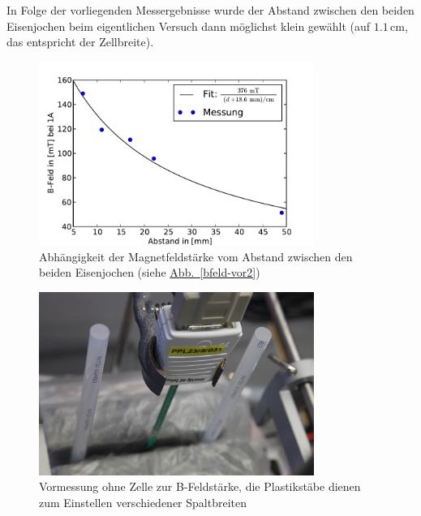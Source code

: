 \documentclass[11pt]{scrartcl}
\newcommand{\unit}[1]{\ensuremath{\,\mathrm{#1}}} %
\newcommand{\abb}[1]{\hyperref[#1]{Abb.~\ref{#1}}}
\begin{document}
In Folge der vorliegenden Messergebnisse wurde der Abstand zwischen den beiden Eisenjochen beim eigentlichen Versuch dann möglichst klein gewählt (auf $1.1 \unit{cm}$, das entspricht der Zellbreite).

\begin{figure}[ht]
\begin{center}
\includegraphics[width=0.8\textwidth]{images/messung_B-Feld-Abstand.pdf}
\end{center}
\vspace{-1.5\baselineskip}
\caption{Abhängigkeit der Magnetfeldstärke vom Abstand zwischen den beiden Eisenjochen (siehe \abb{bfeld-vor2})}
\label{messung_B-Feld-Abstand}
\end{figure}


\begin{figure}[ht]
\begin{center}
\includegraphics[width=0.8\textwidth]{images/bfeld-vor1.jpg}
\end{center}
\vspace{-1.5\baselineskip}
\caption{Vormessung ohne Zelle zur B-Feldst\"arke, die Plastikst\"abe dienen zum Einstellen verschiedener Spaltbreiten}
\label{bfeld-vor1}
\end{figure}
\end{document}
